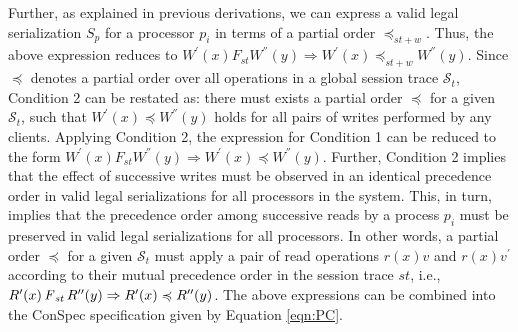 \documentclass[journal,compsoc]{IEEEtran}
\begin{document}
  Further, as explained in previous derivations, we can express a valid legal serialization $S_p$ for a processor $p_i$ in terms of a partial order $\preccurlyeq_{\mathit{st}+w}$. Thus, the above expression reduces to $W^{'}(x) F_\mathit{st}  W^{''} (y) \Rightarrow W^{'}(x) \preccurlyeq_{\mathit{st}+w}  W^{''} (y) $.  %
  Since $ \preccurlyeq$ %
  denotes a partial order over all operations in a global session trace $\mathcal{S}_t$, %
  Condition 2 can be restated as: there must exists a partial order $\preccurlyeq$ for a given $\mathcal{S}_t$, such that $W^{'}(x) \preccurlyeq  W^{''} (y)$ holds for all pairs of writes performed by any clients. Applying Condition 2, the expression for Condition 1 can be reduced to the form $W^{'}(x) F_\mathit{st}  W^{''} (y) \Rightarrow W^{'}(x) \preccurlyeq  W^{''} (y) $. Further, Condition 2 implies that the effect of successive writes must be observed in an identical precedence order in valid legal serializations for all processors in the system. This, in turn, implies that the precedence order among successive reads by a process $p_i$ must be preserved in valid legal serializations for all processors. In other words, a partial order $\preccurlyeq$  for a given $\mathcal{S}_t$ must apply a pair of read operations $r(x){v}$ and $r(x){v}^{'}$ according to their mutual precedence order in the session trace $\mathit{st}$, i.e.,   $R'(x) \operatorname{\it F}_\mathit{st} R''(y)  \Rightarrow  R'(x) \preccurlyeq R''(y)$. The above expressions can be combined into the ConSpec specification given by Equation \ref{eqn:PC}. %
\end{document}
